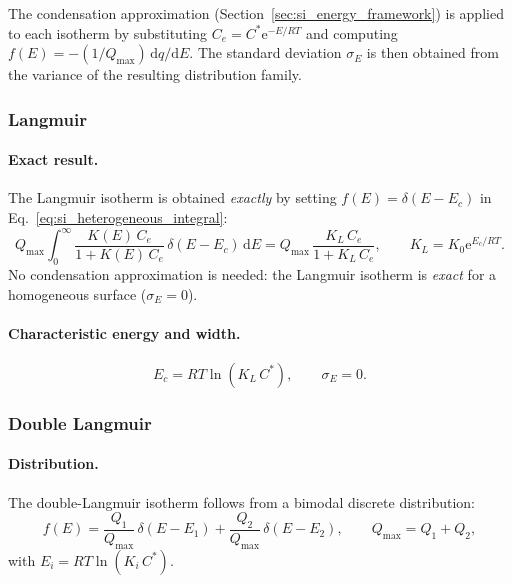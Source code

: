 \documentclass[journal=jacsat,manuscript=article]{achemso}
\begin{document}
The condensation approximation (Section~\ref{sec:si_energy_framework}) is applied
to each isotherm by substituting $C_e = C^{\ast}\mathrm{e}^{-E/RT}$ and computing
$f(E) = -(1/Q_{\max})\,\mathrm{d}q/\mathrm{d}E$. The standard deviation $\sigma_E$
is then obtained from the variance of the resulting distribution family.

\subsubsection{Langmuir}

\paragraph{Exact result.}
The Langmuir isotherm is obtained \emph{exactly} by setting
$f(E) = \delta(E-E_c)$ in Eq.~\eqref{eq:si_heterogeneous_integral}:
\begin{equation}
	Q_{\max}\int_0^{\infty}\frac{K(E)\,C_e}{1+K(E)\,C_e}
	\,\delta(E-E_c)\,\mathrm{d}E
	= Q_{\max}\,\frac{K_L\,C_e}{1+K_L\,C_e},
	\qquad K_L = K_0\mathrm{e}^{E_c/RT}.
\end{equation}
No condensation approximation is needed: the Langmuir isotherm is \emph{exact}
for a homogeneous surface ($\sigma_E = 0$).

\paragraph{Characteristic energy and width.}
\begin{equation}
	E_c = RT\ln(K_L\,C^{\ast}), \qquad \sigma_E = 0.
\end{equation}

\subsubsection{Double Langmuir}

\paragraph{Distribution.}
The double-Langmuir isotherm follows from a bimodal discrete distribution:
\begin{equation}
	f(E) = \frac{Q_1}{Q_{\max}}\,\delta(E-E_1)
	     + \frac{Q_2}{Q_{\max}}\,\delta(E-E_2),
	\qquad Q_{\max} = Q_1+Q_2,
\end{equation}
with $E_i = RT\ln(K_i\,C^{\ast})$.
\end{document}
